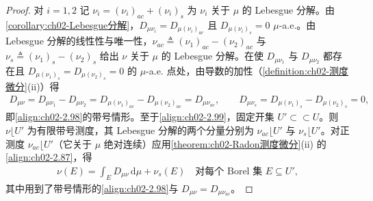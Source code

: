 \documentclass[../../main.tex]{subfiles}%
\begin{document}
\begin{proof}
对 $i=1,2$ 记 $\nu_i=(\nu_i)_{ac}+(\nu_i)_s$ 为 $\nu_i$ 关于 $\mu$ 的 Lebesgue 分解。由\cref{corollary:ch02-Lebesgue分解}，$D_{\mu\nu_i}=D_{\mu(\nu_i)_{ac}}$ 且 $D_{\mu(\nu_i)_s}=0$ $\mu$-a.e.。由 Lebesgue 分解的线性性与唯一性，$\nu_{ac}\triangleq(\nu_1)_{ac}-(\nu_2)_{ac}$ 与 $\nu_s\triangleq(\nu_1)_s-(\nu_2)_s$ 给出 $\nu$ 关于 $\mu$ 的 Lebesgue 分解。在使 $D_{\mu\nu_1}$ 与 $D_{\mu\nu_2}$ 都存在且 $D_{\mu(\nu_1)_s}=D_{\mu(\nu_2)_s}=0$ 的 $\mu$-a.e. 点处，由导数的加性（\cref{definition:ch02-测度微分}(ii)）得
\begin{align*}
D_{\mu\nu}=D_{\mu\nu_1}-D_{\mu\nu_2}=D_{\mu(\nu_1)_{ac}}-D_{\mu(\nu_2)_{ac}}=D_{\mu\nu_{ac}},\qquad D_{\mu\nu_s}=D_{\mu(\nu_1)_s}-D_{\mu(\nu_2)_s}=0,
\end{align*}
即\eqref{align:ch02-2.98}的带号情形。至于\eqref{align:ch02-2.99}，固定开集 $U'\subset\subset U$。则 $\nu\lfloor U'$ 为有限带号测度，其 Lebesgue 分解的两个分量分别为 $\nu_{ac}\lfloor U'$ 与 $\nu_s\lfloor U'$。对正测度 $\nu_{ac}\lfloor U'$（它关于 $\mu$ 绝对连续）应用\cref{theorem:ch02-Radon测度微分}(ii) 的\eqref{align:ch02-2.87}，得
\begin{align*}
\nu(E)=\int_ED_{\mu\nu}\,\mathrm{d}\mu+\nu_s(E)\quad\text{对每个 Borel 集 }E\subseteq U',
\end{align*}
其中用到了带号情形的\eqref{align:ch02-2.98}与 $D_{\mu\nu}=D_{\mu\nu_{ac}}$。
\end{proof}

\hypertarget{lemma:ch02-Vitali覆盖}{}
\hypertarget{lemma:ch02-球积分连续}{}
\hypertarget{theorem:ch02-Lebesgue分解}{}
\hypertarget{proposition:ch02-绝对连续泛函}{}
\hypertarget{theorem:ch02-绝对连续刻画}{}
\end{document}
